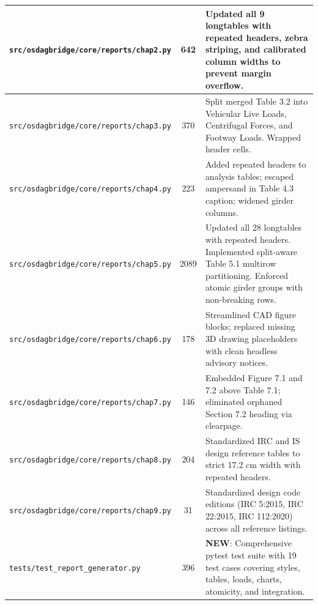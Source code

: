 \documentclass[12pt,a4paper]{article}
\begin{document}
\begin{table}[H]
\begin{tabularx}{\textwidth}{|p{5.6cm}|c|X|}
    \hline
    \rowcolor{OsdagZebra}
    \nolinkurl{src/osdagbridge/core/reports/chap2.py} & 642 & Updated all 9 longtables with repeated headers, zebra striping, and calibrated column widths to prevent margin overflow. \\
    \hline
    \nolinkurl{src/osdagbridge/core/reports/chap3.py} & 370 & Split merged Table 3.2 into Vehicular Live Loads, Centrifugal Forces, and Footway Loads. Wrapped header cells. \\
    \hline
    \rowcolor{OsdagZebra}
    \nolinkurl{src/osdagbridge/core/reports/chap4.py} & 223 & Added repeated headers to analysis tables; escaped ampersand in Table 4.3 caption; widened girder columns. \\
    \hline
    \nolinkurl{src/osdagbridge/core/reports/chap5.py} & 2089 & Updated all 28 longtables with repeated headers. Implemented split-aware Table 5.1 multirow partitioning. Enforced atomic girder groups with non-breaking rows. \\
    \hline
    \rowcolor{OsdagZebra}
    \nolinkurl{src/osdagbridge/core/reports/chap6.py} & 178 & Streamlined CAD figure blocks; replaced missing 3D drawing placeholders with clean headless advisory notices. \\
    \hline
    \nolinkurl{src/osdagbridge/core/reports/chap7.py} & 146 & Embedded Figure 7.1 and 7.2 above Table 7.1; eliminated orphaned Section 7.2 heading via clearpage. \\
    \hline
    \rowcolor{OsdagZebra}
    \nolinkurl{src/osdagbridge/core/reports/chap8.py} & 204 & Standardized IRC and IS design reference tables to strict 17.2 cm width with repeated headers. \\
    \hline
    \nolinkurl{src/osdagbridge/core/reports/chap9.py} & 31 & Standardized design code editions (IRC 5:2015, IRC 22:2015, IRC 112:2020) across all reference listings. \\
    \hline
    \rowcolor{OsdagZebra}
    \nolinkurl{tests/test_report_generator.py} & 396 & \textbf{NEW}: Comprehensive pytest test suite with 19 test cases covering styles, tables, loads, charts, atomicity, and integration. \\
    \hline
  \end{tabularx}
\end{table}
\endgroup

\newpage

\end{document}
